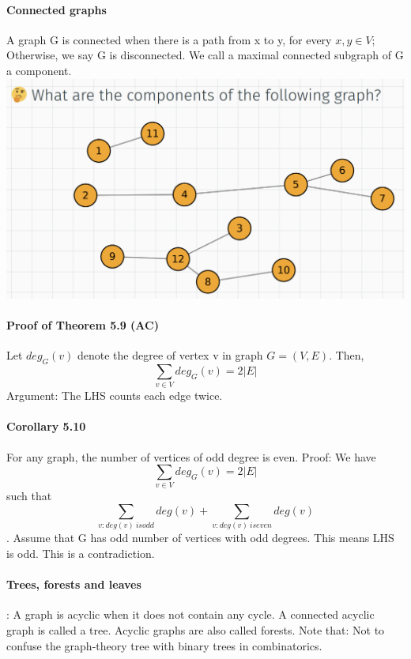 \documentclass{article}
\begin{document}
\paragraph{Connected graphs}
A graph G is connected when there is a path from x to y, for every $x,y\in V$; Otherwise, we say G is disconnected.\newline
We call a maximal connected subgraph of G a component.\newline
\includegraphics{0031}
\paragraph{Proof of Theorem 5.9 (AC)}
Let $deg_G(v)$ denote the degree of vertex v in graph $G=(V,E)$. Then,
$$\sum_{v\in V}deg_G(v)=2|E|$$
Argument:\newline
The LHS counts each edge twice.
\paragraph{Corollary 5.10}
For any graph, the number of vertices of odd degree is even.\newline
Proof:\newline
We have $$\sum_{v\in V}deg_G(v)=2|E|$$
such that
$$\sum_{v:deg(v)\ is odd}deg(v)+\sum_{v:deg(v)\ is even}deg(v)$$.
Assume that G has odd number of vertices with odd degrees. This means LHS is odd. This is a contradiction.

\paragraph{Trees, forests and leaves}:\newline
A graph is acyclic when it does not contain any cycle.\newline
A connected acyclic graph is called a tree.\newline
Acyclic graphs are also called forests.\newline
Note that: Not to confuse the graph-theory tree with binary trees in combinatorics.
\end{document}
